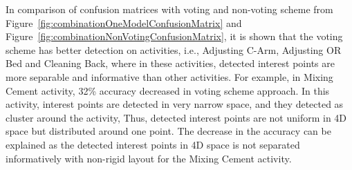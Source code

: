 In comparison of confusion matrices with voting and non-voting scheme from  Figure~\ref{fig:combinationOneModelConfusionMatrix} and Figure~\ref{fig:combinationNonVotingConfusionMatrix}, it is shown that the voting scheme has better detection on activities, i.e., Adjusting C-Arm, Adjusting OR Bed and Cleaning Back, where in these activities, detected interest points are more separable and informative than other activities. For example, in  Mixing Cement activity, 32\% accuracy decreased in voting scheme approach. In this activity, interest points are detected in very narrow space, and they detected as cluster around the activity, Thus, detected interest points are not uniform in 4D space but distributed around one point. The decrease in the accuracy can be explained as the detected interest points in 4D space is not separated informatively with non-rigid layout for the Mixing Cement activity.



















